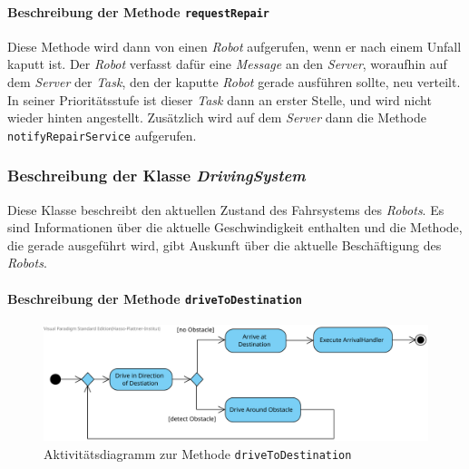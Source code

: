 			\paragraph{Beschreibung der Methode \texttt{requestRepair}}
			Diese Methode wird dann von einen \textit{Robot} aufgerufen, wenn er nach einem Unfall kaputt ist. Der \textit{Robot} verfasst dafür eine \textit{Message} an den \textit{Server}, woraufhin auf dem \textit{Server} der \textit{Task}, den der kaputte \textit{Robot} gerade ausführen sollte, neu verteilt. In seiner Prioritätsstufe ist dieser \textit{Task} dann an erster Stelle, und wird nicht wieder hinten angestellt. Zusätzlich wird auf dem \textit{Server} dann die Methode \texttt{notifyRepairService} aufgerufen.		
			
	\subsubsection{Beschreibung der Klasse \textit{DrivingSystem}}
		
		Diese Klasse beschreibt den aktuellen Zustand des Fahrsystems des \textit{Robots}. 
		Es sind Informationen über die aktuelle Geschwindigkeit enthalten und die Methode, 
		die gerade ausgeführt wird, gibt Auskunft über die aktuelle Beschäftigung des \textit{Robots}.

			\paragraph{Beschreibung der Methode \texttt{driveToDestination}}
			\begin{figure}[H]
			\centering
			\includegraphics[width=1\textwidth]{img/1-Entwurf-7-1-methode_driveToDestination}
			\caption{Aktivitätsdiagramm zur Methode \texttt{driveToDestination}}
			\label{AktivitaetDriveToDestination}
			\end{figure}

